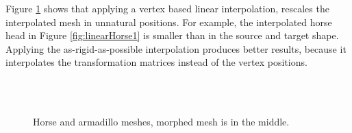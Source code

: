 \documentclass[12pt]{article}
\begin{document}
Figure \ref{fig:linearInterpolation} shows that applying a vertex based linear interpolation, rescales the interpolated mesh in unnatural positions.
For example, the interpolated horse head in Figure \ref{fig:linearHorse1} is smaller than in the source and target shape.
Applying the as-rigid-as-possible interpolation produces better results, because it interpolates the transformation matrices instead of the vertex positions.

\begin{figure}
\thinspace
{} \\
~
\caption{Horse and armadillo meshes, morphed mesh is in the middle.}
\label{fig:linearInterpolation}
\end{figure}



\end{document}
